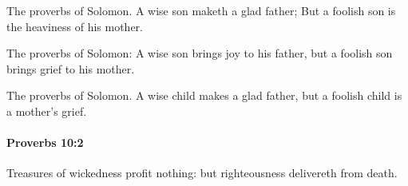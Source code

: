 			\begin{versebox}
					\item[BHS] 
					\item[ASV] The proverbs of Solomon. A wise son maketh a glad father; But a foolish son is the heaviness of his mother.
					\item[NIV] The proverbs of Solomon: A wise son brings joy to his father, but a foolish son brings grief to his mother.
					\item[NRSV] The proverbs of Solomon. A wise child makes a glad father, but a foolish child is a mother’s grief.
			\end{versebox}

		\paragraph{Proverbs 10:2} %
			\label{PROVERBS-10-2}

			Treasures of wickedness profit nothing: but righteousness delivereth from death.

